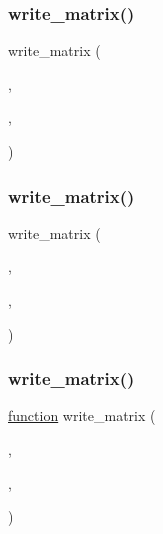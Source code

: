 \subsubsection{\texorpdfstring{write\+\_\+matrix()}{write\_matrix()}\hspace{0.1cm}{\footnotesize\ttfamily [7/9]}}
{\footnotesize\ttfamily write\+\_\+matrix (\begin{DoxyParamCaption}\item[{\hyperlink{a00473_ae0527cbfd56392d5095a691bbf10ba5b}{f\+ID}}]{,  }\item[{\hyperlink{a00473_a90f04ab0b3b4b834efda241ab283fc57}{Dsq}}]{,  }\item[{\textquotesingle{}\hyperlink{a00473_a90f04ab0b3b4b834efda241ab283fc57}{Dsq}\textquotesingle{}}]{ }\end{DoxyParamCaption})}

\mbox{\label{a01014_af2772e6d0019ffff1bf440639d17973e}} 
\subsubsection{\texorpdfstring{write\+\_\+matrix()}{write\_matrix()}\hspace{0.1cm}{\footnotesize\ttfamily [8/9]}}
{\footnotesize\ttfamily write\+\_\+matrix (\begin{DoxyParamCaption}\item[{\hyperlink{a00473_ae0527cbfd56392d5095a691bbf10ba5b}{f\+ID}}]{,  }\item[{\hyperlink{a01014_ad06233c3cbd809b83fb292471e66fc78}{Vfq}}]{,  }\item[{\textquotesingle{}\hyperlink{a01014_ad06233c3cbd809b83fb292471e66fc78}{Vfq}\textquotesingle{}}]{ }\end{DoxyParamCaption})}

\mbox{\label{a01014_ad22794c697c5c5c9841157f6851a087c}} 
\subsubsection{\texorpdfstring{write\+\_\+matrix()}{write\_matrix()}\hspace{0.1cm}{\footnotesize\ttfamily [9/9]}}
{\footnotesize\ttfamily \hyperlink{a00611_a2420833d971716e9bab41cc9fb3abba1}{function} write\+\_\+matrix (\begin{DoxyParamCaption}\item[{\hyperlink{a00473_ae0527cbfd56392d5095a691bbf10ba5b}{f\+ID}}]{,  }\item[{A}]{,  }\item[{name}]{ }\end{DoxyParamCaption})}

